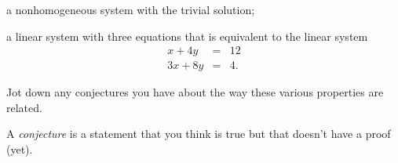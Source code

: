\documentclass[hidelinks,12pt,handout]{ximera}
\begin{document}
\begin{question}
a nonhomogeneous system with the trivial solution;
\vfill
\end{question}

\begin{question} a linear system with three equations that is equivalent to the linear system
	\begin{eqnarray*} x + 4 y & = & 12 \\
				   3x + 8y &=&  4.
	\end{eqnarray*}
	\vfill
\end{question}

\begin{question} Jot down any conjectures you have about the way these various properties are related.

\begin{hint} A \textit{conjecture} is a statement that you think is true but that doesn't have a proof (yet). 
\end{hint}
\vfill
\end{question}
\end{document}
